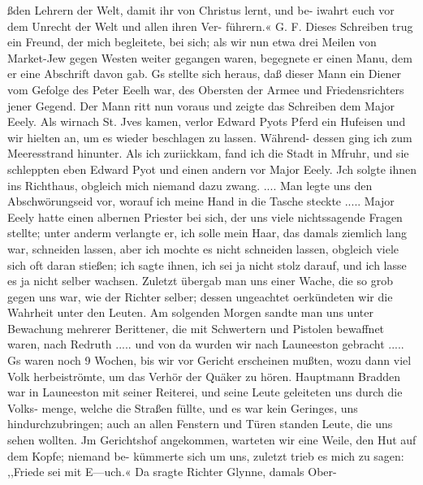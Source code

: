 ßden Lehrern der Welt, damit ihr von Christus lernt, und be-
iwahrt euch vor dem Unrecht der Welt und allen ihren Ver-
führern.« G. F.
Dieses Schreiben trug ein Freund, der mich begleitete, bei
sich; als wir nun etwa drei Meilen von Market-Jew gegen
Westen weiter gegangen waren, begegnete er einen Manu, dem
er eine Abschrift davon gab. Gs stellte sich heraus, daß dieser
Mann ein Diener vom Gefolge des Peter Eeelh war, des
Obersten der Armee und Friedensrichters jener Gegend. Der Mann
ritt nun voraus und zeigte das Schreiben dem Major Eeely. Als
wirnach St. Jves kamen, verlor Edward Pyots Pferd ein Hufeisen
und wir hielten an, um es wieder beschlagen zu lassen. Während-
dessen ging ich zum Meeresstrand hinunter. Als ich zuriickkam,
fand ich die Stadt in Mfruhr, und sie schleppten eben Edward
Pyot und einen andern vor Major Eeely. Jch solgte ihnen ins
Richthaus, obgleich mich niemand dazu zwang. .... Man
legte uns den Abschwörungseid vor, worauf ich meine Hand in
die Tasche steckte ..... Major Eeely hatte einen albernen
Priester bei sich, der uns viele nichtssagende Fragen stellte; unter
anderm verlangte er, ich solle mein Haar, das damals ziemlich
lang war, schneiden lassen, aber ich mochte es nicht schneiden
lassen, obgleich viele sich oft daran stießen; ich sagte ihnen, ich
sei ja nicht stolz darauf, und ich lasse es ja nicht selber wachsen.
Zuletzt übergab man uns einer Wache, die so grob gegen uns
war, wie der Richter selber; dessen ungeachtet oerkündeten wir
die Wahrheit unter den Leuten. Am solgenden Morgen sandte
man uns unter Bewachung mehrerer Berittener, die mit Schwertern
und Pistolen bewaffnet waren, nach Redruth ..... und von da
wurden wir nach Launeeston gebracht .....
Gs waren noch 9 Wochen, bis wir vor Gericht erscheinen
mußten, wozu dann viel Volk herbeiströmte, um das Verhör der
Quäker zu hören. Hauptmann Bradden war in Launeeston mit
seiner Reiterei, und seine Leute geleiteten uns durch die Volks-
menge, welche die Straßen füllte, und es war kein Geringes, uns
hindurchzubringen; auch an allen Fenstern und Türen standen
Leute, die uns sehen wollten. Jm Gerichtshof angekommen,
warteten wir eine Weile, den Hut auf dem Kopfe; niemand be-
kümmerte sich um uns, zuletzt trieb es mich zu sagen: ,,Friede
sei mit E—uch.« Da sragte Richter Glynne, damals Ober-


